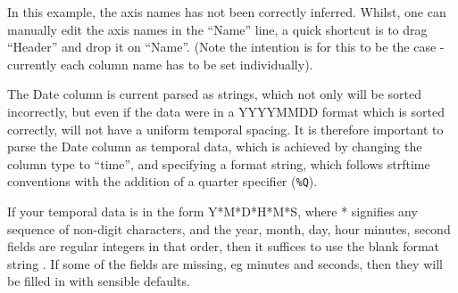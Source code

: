 In this example, the axis names has not been correctly
inferred. Whilst, one can manually edit the axis names in the ``Name''
line, a quick shortcut is to drag ``Header'' and drop it on
``Name''. (Note the intention is for this to be the case - currently
each column name has to be set individually).

\begin{center}
\end{center}


The Date column is current parsed as strings, which not only will be
sorted incorrectly, but even if the data were in a YYYYMMDD format
which is sorted correctly, will not have a uniform temporal
spacing. It is therefore important to parse the Date column as
temporal data, which is achieved by changing the column type to
``time'', and specifying a format string, which follows strftime
conventions with the addition of a quarter specifier (\verb+%Q+).
\label{strftime format specifier}

If your temporal data is in the form Y*M*D*H*M*S, where * signifies
any sequence of non-digit characters, and the year, month, day, hour
minutes, second fields are regular integers in that order, then it
suffices to use the blank format string . If some of the fields are missing, eg minutes and seconds,
then they will be filled in with sensible defaults.

\begin{center}
\end{center}

